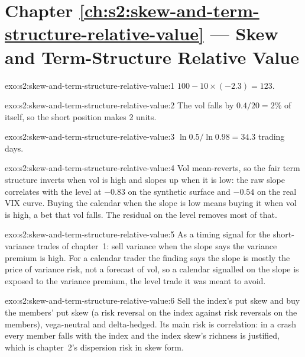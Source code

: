 \section*{Chapter \ref{ch:s2:skew-and-term-structure-relative-value} --- Skew and Term-Structure Relative Value}

\begin{solution}{exo:s2:skew-and-term-structure-relative-value:1}
$100 - 10 \times (-2.3) = 123$.
\end{solution}

\begin{solution}{exo:s2:skew-and-term-structure-relative-value:2}
The vol falls by $0.4/20 = 2\%$ of itself, so the short position makes 2 units.
\end{solution}

\begin{solution}{exo:s2:skew-and-term-structure-relative-value:3}
$\ln 0.5/\ln 0.98 = 34.3$ trading days.
\end{solution}

\begin{solution}{exo:s2:skew-and-term-structure-relative-value:4}
Vol mean-reverts, so the fair term structure inverts when vol is high and slopes up when it is low: the raw slope correlates with the level at
$-0.83$ on the synthetic surface and $-0.54$ on the real VIX curve. Buying the calendar when the slope is low means buying it when vol is high, a bet
that vol falls. The residual on the level removes most of that.
\end{solution}

\begin{solution}{exo:s2:skew-and-term-structure-relative-value:5}
As a timing signal for the short-variance trades of chapter~1: sell variance when the slope says the variance premium is high. For a calendar trader
the finding says the slope is mostly the price of variance risk, not a forecast of vol, so a calendar signalled on the slope is exposed to the variance
premium, the level trade it was meant to avoid.
\end{solution}

\begin{solution}{exo:s2:skew-and-term-structure-relative-value:6}
Sell the index's put skew and buy the members' put skew (a risk reversal on the index against risk reversals on the members), vega-neutral and
delta-hedged. Its main risk is correlation: in a crash every member falls with the index and the index skew's richness is justified, which is
chapter~2's dispersion risk in skew form.
\end{solution}


